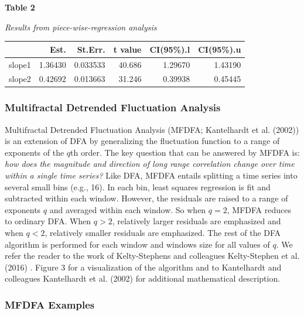 \documentclass[
  man]{apa6}
\begin{document}
\textbf{Table 2}

\emph{Results from piece-wise-regression analysis}

\begin{table}

\centering
\begin{tabular}[t]{l|r|r|r|r|r}
\hline
  & Est. & St.Err. & t value & CI(95\%).l & CI(95\%).u\\
\hline
slope1 & 1.36430 & 0.033533 & 40.686 & 1.29670 & 1.43190\\
\hline
slope2 & 0.42692 & 0.013663 & 31.246 & 0.39938 & 0.45445\\
\hline
\end{tabular}
\end{table}

\hypertarget{multifractal-detrended-fluctuation-analysis}{%
\subsubsection{Multifractal Detrended Fluctuation Analysis}\label{multifractal-detrended-fluctuation-analysis}}

Multifractal Detrended Fluctuation Analysis (MFDFA;
Kantelhardt et al. (2002)) is an extension of DFA
by generalizing the fluctuation function to a range of exponents of the
\(q\)th order. The key question that can be answered by MFDFA is: \emph{how
does the magnitude and direction of long range correlation change over
time within a single time series?} Like DFA, MFDFA entails splitting a
time series into several small bins (e.g., 16). In each bin, least
squares regression is fit and subtracted within each window. However,
the residuals are raised to a range of exponents \(q\) and averaged within
each window. So when \(q = 2\), MFDFA reduces to ordinary DFA. When
\(q >2\), relatively larger residuals are emphasized and when \(q < 2\),
relatively smaller residuals are emphasized. The rest of the DFA
algorithm is performed for each window and windows size for all values
of \(q\). We refer the reader to the work of Kelty-Stephens and colleagues
Kelty-Stephen et al. (2016) . Figure 3 for a
visualization of the algorithm and to Kantelhardt and colleagues
Kantelhardt et al. (2002) for additional
mathematical description.

\hypertarget{mfdfa-examples}{%
\subsubsection{MFDFA Examples}\label{mfdfa-examples}}
\end{document}
